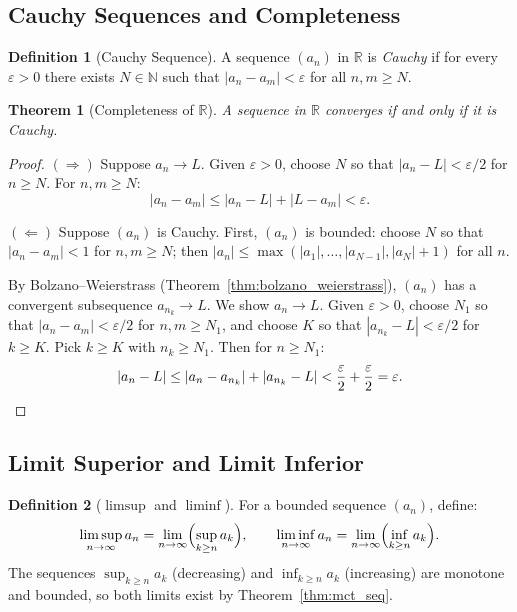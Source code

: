 \documentclass[11pt,a4paper]{article}
\theoremstyle{definition}
\newtheorem{definition}{Definition}[section]
\theoremstyle{plain}
\newtheorem{theorem}{Theorem}[section]
\theoremstyle{remark}
\newcommand{\R}{\mathbb{R}}
\newcommand{\N}{\mathbb{N}}
\begin{document}
\subsection{Cauchy Sequences and Completeness}
\label{subsec:cauchy}

\begin{definition}[Cauchy Sequence]
\label{def:cauchy}
A sequence $(a_n)$ in $\R$ is \emph{Cauchy} if for every $\varepsilon > 0$ there
exists $N \in \N$ such that $|a_n - a_m| < \varepsilon$ for all $n, m \ge N$.
\end{definition}

\begin{theorem}[Completeness of $\R$]
\label{thm:cauchy_complete}
A sequence in $\R$ converges if and only if it is Cauchy.
\end{theorem}

\begin{proof}
$(\Rightarrow)$ Suppose $a_n \to L$. Given $\varepsilon > 0$, choose $N$ so that
$|a_n - L| < \varepsilon/2$ for $n \ge N$. For $n, m \ge N$:
\[
|a_n - a_m| \le |a_n - L| + |L - a_m| < \varepsilon.
\]

$(\Leftarrow)$ Suppose $(a_n)$ is Cauchy. First, $(a_n)$ is bounded: choose $N$
so that $|a_n - a_m| < 1$ for $n, m \ge N$; then $|a_n| \le \max(|a_1|, \ldots,
|a_{N-1}|, |a_N| + 1)$ for all $n$.

By Bolzano--Weierstrass (Theorem~\ref{thm:bolzano_weierstrass}), $(a_n)$ has a
convergent subsequence $a_{n_k} \to L$. We show $a_n \to L$. Given
$\varepsilon > 0$, choose $N_1$ so that $|a_n - a_m| < \varepsilon/2$ for
$n, m \ge N_1$, and choose $K$ so that $|a_{n_k} - L| < \varepsilon/2$ for
$k \ge K$. Pick $k \ge K$ with $n_k \ge N_1$. Then for $n \ge N_1$:
\[
|a_n - L| \le |a_n - a_{n_k}| + |a_{n_k} - L|
< \frac{\varepsilon}{2} + \frac{\varepsilon}{2} = \varepsilon. \qedhere
\]
\end{proof}

\subsection{Limit Superior and Limit Inferior}
\label{subsec:limsup_liminf}

\begin{definition}[$\limsup$ and $\liminf$]
\label{def:limsup_liminf}
For a bounded sequence $(a_n)$, define:
\[
\limsup_{n \to \infty} a_n = \lim_{n \to \infty}
\Bigl(\sup_{k \ge n} a_k\Bigr), \qquad
\liminf_{n \to \infty} a_n = \lim_{n \to \infty}
\Bigl(\inf_{k \ge n} a_k\Bigr).
\]
The sequences $\sup_{k \ge n} a_k$ (decreasing) and $\inf_{k \ge n} a_k$
(increasing) are monotone and bounded, so both limits exist by
Theorem~\ref{thm:mct_seq}.
\end{definition}
\end{document}
